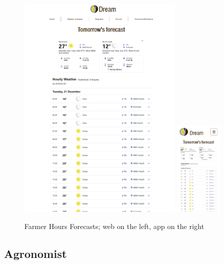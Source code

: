 \documentclass{article}
\begin{document}
        \begin{figure} [h]
            \centering
            \includegraphics[width=0.7\textwidth]{images/UserInterfaces/Farmer/Weather/HoursForecastWeb.png}
            \quad
            \includegraphics[width=0.2\textwidth]{images/UserInterfaces/Farmer/Weather/HoursForecastApp.png}
            \quad
            \caption{\label{fig:farmerWeatherHaour}Farmer Hours Forecasts; web on the left, app on the right}
        \end{figure}
    
    
    \newpage
    
    
    \subsection{Agronomist}
    
\end{document}
